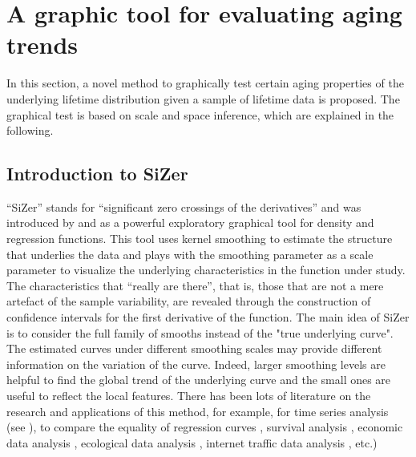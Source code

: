 \documentclass[preprint,12pt]{elsarticle}
\begin{document}


\section{A graphic tool for evaluating aging trends}  \label{sizer1}
In this section, a novel method to graphically test certain aging properties of the underlying lifetime distribution given a sample of lifetime data is proposed. The graphical test is based on scale and space inference, which are explained in the following.

\subsection{Introduction to SiZer}

``SiZer'' stands for ``significant zero crossings of the derivatives'' and was introduced by \cite{CM99} and \cite{CM02} as a powerful exploratory graphical tool for density and regression functions. This tool uses kernel smoothing to estimate the structure that underlies the data and plays with the smoothing parameter as a scale parameter to visualize the underlying characteristics in the function under study. The characteristics that ``really are there'', that is, those that are not a mere artefact of the sample variability, are revealed through the construction of confidence intervals for the first derivative of the function. The main idea of SiZer is to consider the full family of smooths instead of the "true underlying curve". The estimated curves under different smoothing scales may provide different information on the variation of the curve. Indeed, larger smoothing levels are helpful to find the global trend of the underlying curve and the small ones are useful to reflect the local features. There has been lots of literature on the research and applications of this method, for example, for time series analysis (see \cite{PHK2009}), to compare the equality of regression curves \cite{PK2008}, survival analysis \cite{MU2004}, economic data analysis \cite{PZ2007}, ecological data analysis \cite{Setal2009}, internet traffic data analysis \cite{P2005}, etc.) 
\end{document}

